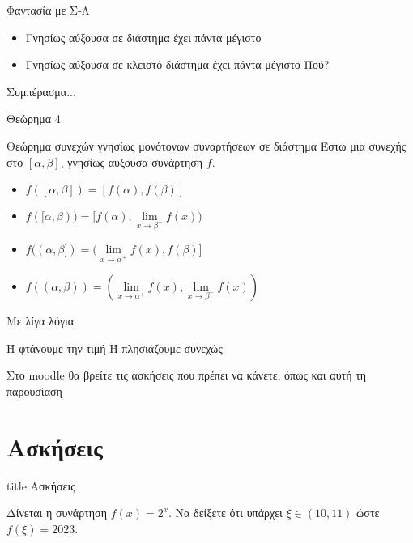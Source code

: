 \documentclass{presentation}
\begin{document}
\begin{frame}{Φαντασία με Σ-Λ}
      \begin{itemize}
            \item<1-> Γνησίως αύξουσα σε διάστημα έχει πάντα μέγιστο
            \item<2-> Γνησίως αύξουσα σε κλειστό διάστημα έχει πάντα μέγιστο  Πού?
      \end{itemize}
      Συμπέρασμα...
\end{frame}

\begin{frame}{Θεώρημα 4}
      \begin{block}{Θεώρημα συνεχών γνησίως μονότονων συναρτήσεων σε διάστημα}
            Έστω μια συνεχής στο $[α,β]$, γνησίως αύξουσα συνάρτηση $f$.
            \begin{itemize}
                  \item<1-> $f([α,β])=[f(α),f(β)]$
                  \item<2-> $f([α,β))=[f(α),\lim\limits_{x \to β^-}{ f(x) })$
                  \item<3-> $f((α,β])=(\lim\limits_{x \to α^+}{ f(x) },f(β)]$
                  \item<4-> $f((α,β))=(\lim\limits_{x \to α^+}{ f(x) },\lim\limits_{x \to β^-}{ f(x) })$
            \end{itemize}
      \end{block}
      Με λίγα λόγια

      Ή φτάνουμε την τιμή Ή πλησιάζουμε συνεχώς
\end{frame}

\begin{frame}[noframenumbering]
      Στο moodle θα βρείτε τις ασκήσεις που πρέπει να κάνετε, όπως και αυτή τη παρουσίαση
\end{frame}

\section{Ασκήσεις}

\begin{frame}[noframenumbering]
      \vfill
      \centering
      \begin{beamercolorbox}[sep=8pt,center,shadow=true,rounded=true]{title}
            Ασκήσεις
      \end{beamercolorbox}
      \vfill
\end{frame}

\begin{askisi}
      Δίνεται η συνάρτηση $f(x)=2^x$. Να δείξετε ότι υπάρχει $ξ\in (10,11)$ ώστε $f(ξ)=2023$.

      \hyperlink{Λύση1}{}
\end{askisi}
\end{document}
